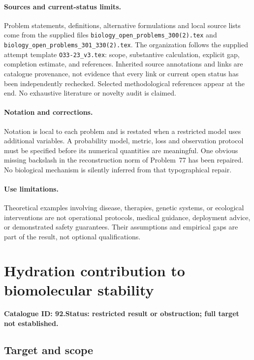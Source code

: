 \documentclass[11pt]{article}
\begin{document}
\paragraph{Sources and current-status limits.}
Problem statements, definitions, alternative formulations and local source lists
come from the supplied files
\texttt{biology\_open\_problems\_300(2).tex} and
\texttt{biology\_open\_problems\_301\_330(2).tex}.
The organization follows the supplied attempt template
\texttt{O33-23\_v3.tex}: scope, substantive calculation, explicit gap,
completion estimate, and references. Inherited source annotations and links are
catalogue provenance, not evidence that every link or current open status has
been independently rechecked. Selected methodological references appear at the
end. No exhaustive literature or novelty audit is claimed.

\paragraph{Notation and corrections.}
Notation is local to each problem and is restated when a restricted model uses
additional variables. A probability model, metric, loss and observation protocol
must be specified before its numerical quantities are meaningful. One obvious
missing backslash in the reconstruction norm of Problem~77 has been repaired.
No biological mechanism is silently inferred from that typographical repair.

\paragraph{Use limitations.}
Theoretical examples involving disease, therapies, genetic systems, or ecological
interventions are not operational protocols, medical guidance, deployment advice,
or demonstrated safety guarantees. Their assumptions and empirical gaps are part
of the result, not optional qualifications.

\setcounter{section}{91}
\section{Hydration contribution to biomolecular stability}
\label{prob:092}
\noindent\textbf{Catalogue ID: 92.}\quad \textbf{Status: restricted result or obstruction; full target not established.}
\subsection{Target and scope}
\end{document}
